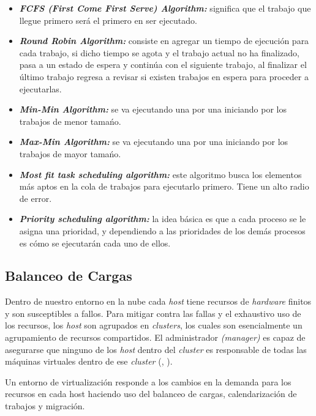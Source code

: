 \begin{itemize}
	\item \textit{\textbf{FCFS (First Come First Serve) Algorithm:}} significa que el trabajo que llegue primero ser\'a el primero en ser ejecutado.
	\item \textit{\textbf{Round Robin Algorithm:}} consiste en agregar un tiempo de ejecuci\'on para cada trabajo, si dicho tiempo se agota y el trabajo actual no ha finalizado, pasa a un estado de espera y contin\'ua con el siguiente trabajo, al finalizar el \'ultimo trabajo regresa a revisar si existen trabajos en espera para proceder a ejecutarlas. 
	\item  \textit{\textbf{Min-Min Algorithm:}} se va ejecutando una por una iniciando por los trabajos de menor tama\'no.
	\item  \textit{\textbf{Max-Min Algorithm:}} se va ejecutando una por una iniciando por los trabajos de mayor tama\'no.
	\item  \textit{\textbf{Most fit task scheduling algorithm:}} este algoritmo busca los elementos m\'as aptos en la cola de trabajos para ejecutarlo primero. Tiene un alto radio de error.
	\item \textit{\textbf{Priority scheduling algorithm:}} la idea b\'asica es que a cada proceso se le asigna una prioridad, y dependiendo a las prioridades de los dem\'as procesos es c\'omo se ejecutar\'an cada uno de ellos.
\end{itemize}

\subsection*{Balanceo de Cargas}

Dentro de nuestro entorno en la nube cada \textit{host} tiene recursos de \textit{hardware} finitos y son susceptibles a fallos. Para mitigar contra las fallas y el exhaustivo uso de los recursos, los \textit{host} son agrupados en \textit{clusters}, los cuales son esencialmente un agrupamiento de recursos compartidos. El administrador \textit{(manager)} es capaz de asegurarse que ninguno de los \textit{host} dentro del \textit{cluster} es responsable de todas las m\'aquinas virtuales dentro de ese \textit{cluster} (\citeauthor{redhat}, \citeyear{redhat}).

Un entorno de virtualizaci\'on responde a los cambios en la demanda para los recursos en cada host haciendo uso del balanceo de cargas, calendarizaci\'on de trabajos y migraci\'on.

